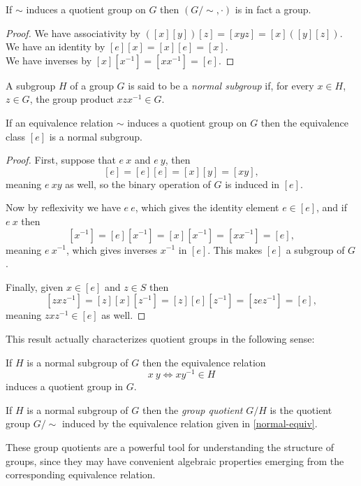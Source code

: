 \begin{prop}
	If $\sim$ induces a quotient group on $G$ then $(G/\sim, \cdot)$ is in fact a group.
\end{prop}
\begin{proof}
We have associativity by $([x][y])[z] = [xyz] = [x]([y][z])$.\\
We have an identity by $[e][x] = [x][e] = [x]$.\\
We have inverses by $[x][x^{-1}] = [xx^{-1}] = [e]$.
\end{proof}

\begin{define}
	A subgroup $H$ of a group $G$ is said to be a \emph{normal subgroup} if, for every $x \in H$, $z \in G$, the group product $xzx^{-1} \in G$.
\end{define}

\begin{prop}
	If an equivalence relation $\sim$ induces a quotient group on $G$ then the equivalence class $[e]$ is a normal subgroup.
\end{prop}
\begin{proof}
	First, suppose that $e~x$ and $e~y$, then 
	\[[e] = [e][e] = [x][y] = [xy],\]
	meaning $e ~ xy$ as well, so the binary operation of $G$ is induced in $[e]$.
	
	Now by reflexivity we have $e ~ e$, which gives the identity element $e \in [e]$, and if $e ~ x$ then
	\[[x^{-1}] = [e][x^{-1}] = [x][x^{-1}] = [xx^{-1}] = [e],\]
	meaning $e ~ x^{-1}$, which gives inverses $x^{-1}$ in $[e]$. This makes $[e]$ a subgroup of $G$.
	
Finally, given $x \in [e]$ and $z \in S$ then
\[[zxz^{-1}] = [z][x][z^{-1}] = [z][e][z^{-1}] = [zez^{-1}] = [e],\]
meaning $zxz^{-1} \in [e]$ as well.
\end{proof}

This result actually characterizes quotient groups in the following sense:
\begin{prop}\label{normal-equiv}
	If $H$ is a normal subgroup of $G$ then the equivalence relation
	\[x ~ y \iff xy^{-1} \in H\]
	induces a quotient group in $G$.
\end{prop}

\begin{define}
	If $H$ is a normal subgroup of $G$ then the \emph{group quotient} $G/H$ is the quotient group $G/\sim$ induced by the equivalence relation given in \autoref{normal-equiv}.
\end{define}
These group quotients are a powerful tool for understanding the structure of groups, since they may have convenient algebraic properties emerging from the corresponding equivalence relation.

